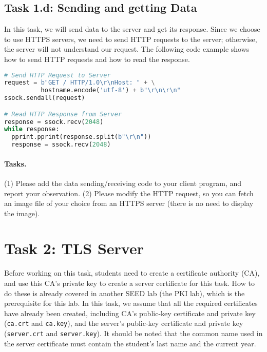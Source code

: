 \subsection{Task 1.d: Sending and getting Data}

In this task, we will send data to the server and get its 
response. Since we choose to use HTTPS servers, 
we need to send HTTP requests to the server; otherwise, the server
will not understand our request. 
The following code example shows how to send HTTP requests and how
to read the response. 


\begin{lstlisting}[language=Python]
# Send HTTP Request to Server
request = b"GET / HTTP/1.0\r\nHost: " + \
          hostname.encode('utf-8') + b"\r\n\r\n"
ssock.sendall(request)

# Read HTTP Response from Server
response = ssock.recv(2048)
while response:
  pprint.pprint(response.split(b"\r\n"))
  response = ssock.recv(2048)
\end{lstlisting}


\paragraph{Tasks.} (1) Please add the data sending/receiving code to your client program, and
report your observation.  (2) Please modify the HTTP request, so you can
fetch an image file of your choice from an HTTPS server (there is 
no need to display the image). 



\section{Task 2: TLS Server}

Before working on this task, students need to create a 
certificate authority (CA), and use this CA's private key
to create a server certificate for this task. 
How to do these is already covered in another SEED lab (the PKI lab),
which is the prerequisite for this lab. In this task, we assume that
all the required certificates have already been created, including
CA's public-key certificate and private key (\texttt{ca.crt} and \texttt{ca.key}), 
and the server's public-key certificate and private 
key (\texttt{server.crt} and \texttt{server.key}). 
It should be noted that the common name used in the server certificate 
must contain the student's last name and the current year. 


